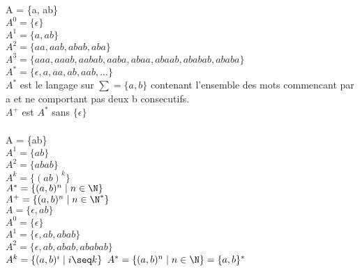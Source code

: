 \documentclass{article}
\begin{document}
\section{}
A = \{a, ab\}\\
$ A^0 = \{\epsilon\} $\\
$ A^1 = \{a,ab\} $\\
$ A^2 = \{aa,aab,abab,aba\} $\\
$ A^3 = \{aaa,aaab,aabab,aaba,abaa,abaab,ababab,ababa\} $\\
$A^* = \{\epsilon,a,aa,ab,aab,...\} $\\

$A^*$ est le langage sur $\sum = \{a,b\}$ contenant l'ensemble des mots commencant par a et ne comportant pas deux b consecutifs.\\

$A^+$ est $A^*$ sans $\{\epsilon\}$\\
\\

A = \{ab\}\\
$ A^1 = \{ab\} $\\
$ A^2 = \{abab\} $\\
$ A^k = \{(ab)^k\} $\\
$ A^* = \{(a,b)^n \mid n \in \N\}$\\
$ A^+ = \{(a,b)^n \mid n \in \N^*\}$\\


$A = \{\epsilon, ab\}$\\
$ A^0 = \{\epsilon\} $\\
$ A^1 = \{\epsilon,ab,abab\} $\\
$ A^2 = \{\epsilon,ab,abab,ababab\} $\\
$ A^k = \{(a,b)^i \mid i \seq k\}$
$ A^* = \{(a,b)^n \mid n \in \N\} = \{a,b\}^* $\\
\end{document}
